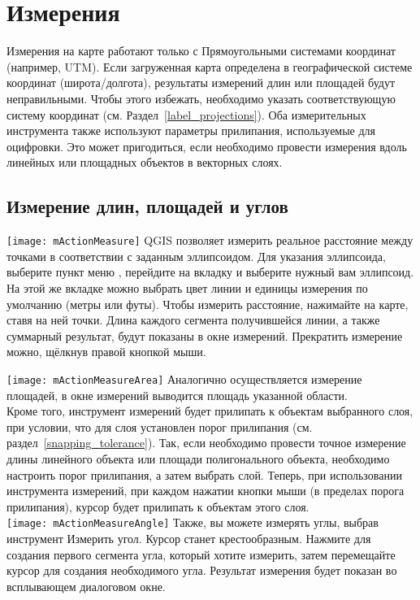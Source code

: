 \section{Измерения}\label{sec:measure}

Измерения на карте работают только с Прямоугольными системами координат
(например, UTM). Если загруженная карта определена в географической
системе координат (широта/долгота), результаты измерений длин или площадей
будут неправильными. Чтобы этого избежать, необходимо указать
соответствующую систему координат (см. Раздел~\ref{label_projections}).
Оба измерительных инструмента также используют параметры прилипания, используемые
для оцифровки. Это может пригодиться, если необходимо провести измерения вдоль
линейных или площадных объектов в векторных слоях.

\subsection{Измерение длин, площадей и углов}

\texttt{[image: mActionMeasure]}
QGIS позволяет измерить реальное расстояние между точками в
соответствии с заданным эллипсоидом. Для указания эллипсоида, выберите пункт
меню  \arrow {}, перейдите на вкладку
 и выберите нужный вам эллипсоид. На этой же вкладке
можно выбрать цвет линии и единицы измерения по умолчанию (метры или футы).
Чтобы измерить расстояние, нажимайте на карте, ставя на ней точки. Длина
каждого сегмента получившейся линии, а также суммарный результат, будут
показаны в окне измерений. Прекратить измерение можно, щёлкнув правой кнопкой мыши.

\texttt{[image: mActionMeasureArea]} Аналогично осуществляется измерение
площадей, в окне измерений выводится площадь указанной области.\\
Кроме того, инструмент измерений будет прилипать к объектам выбранного слоя,
при условии, что для слоя установлен порог прилипания
(см. раздел~\ref{snapping_tolerance}). Так, если необходимо провести точное
измерение длины линейного объекта или площади полигонального объекта, необходимо
настроить порог прилипания, а затем выбрать слой. Теперь, при использовании
инструмента измерений, при каждом нажатии кнопки мыши (в пределах порога
прилипания), курсор будет прилипать к объектам этого слоя. \\
\texttt{[image: mActionMeasureAngle]}
Также, вы можете измерять углы, выбрав инструмент Измерить угол. Курсор
станет крестообразным. Нажмите для создания первого сегмента угла, который
хотите измерить, затем перемещайте курсор для создания необходимого угла.
Результат измерения будет показан во всплывающем диалоговом окне.

